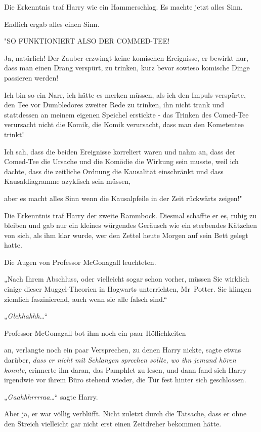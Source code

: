 {Die Erkenntnis traf Harry wie ein Hammerschlag. Es machte jetzt alles Sinn.

Endlich ergab alles einen Sinn.

"SO FUNKTIONIERT ALSO DER COMMED-TEE!

Ja, natürlich! Der Zauber erzwingt keine komischen Ereignisse, er bewirkt nur, dass man einen Drang verspürt, zu trinken, kurz bevor sowieso komische Dinge passieren werden!

Ich bin so ein Narr, ich hätte es merken müssen, als ich den Impuls verspürte, den Tee vor Dumbledores zweiter Rede zu trinken, ihn nicht trank und stattdessen an meinem eigenen Speichel erstickte - das Trinken des Comed-Tee verursacht nicht die Komik, die Komik verursacht, dass man den Kometentee trinkt!

Ich sah, dass die beiden Ereignisse korreliert waren und nahm an, dass der Comed-Tee die Ursache und die Komödie die Wirkung sein musste, weil ich dachte, dass die zeitliche Ordnung die Kausalität einschränkt und dass Kausaldiagramme azyklisch sein müssen,

aber es macht alles Sinn wenn die Kausalpfeile in der Zeit rückwärts zeigen!"

Die Erkenntnis traf Harry der zweite Rammbock. Diesmal schaffte er es, ruhig zu bleiben und gab nur ein kleines würgendes Geräusch wie ein sterbendes Kätzchen von sich, als ihm klar wurde, wer den Zettel heute Morgen auf sein Bett gelegt hatte.

Die Augen von Professor McGonagall leuchteten.

„Nach Ihrem Abschluss, oder vielleicht sogar schon vorher, müssen Sie wirklich einige dieser Muggel-Theorien in Hogwarts unterrichten, Mr~Potter. Sie klingen ziemlich faszinierend, auch wenn sie alle falsch sind.“

„\emph{Glehhahhh}…“

Professor McGonagall bot ihm noch ein paar Höflichkeiten

an, verlangte noch ein paar Versprechen, zu denen Harry nickte, sagte etwas darüber, \emph{dass er nicht mit Schlangen sprechen sollte, wo ihn jemand hören konnte}, erinnerte ihn daran, das Pamphlet zu lesen, und dann fand sich Harry irgendwie vor ihrem Büro stehend wieder, die Tür fest hinter sich geschlossen.

„\emph{Gaahhhrrrraa}…“ sagte Harry.

Aber ja, er war völlig verblüfft. Nicht zuletzt durch die Tatsache, dass er ohne den Streich vielleicht gar nicht erst einen Zeitdreher bekommen hätte.

}
